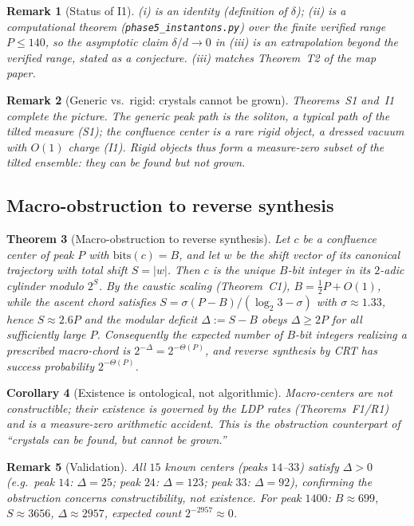 \documentclass[12pt,a4paper]{article}
\newtheorem{theorem}{Theorem}[section]
\newtheorem{corollary}[theorem]{Corollary}
\newtheorem{remark}[theorem]{Remark}
\begin{document}
\begin{remark}[Status of I1]
(i) is an identity (definition of $\delta$); (ii) is a computational theorem
(\texttt{phase5\_instantons.py}) over the finite verified range $P\le140$, so the
asymptotic claim $\delta/d\to0$ in (iii) is an extrapolation beyond the verified
range, stated as a conjecture. (iii) matches Theorem~T2 of the map paper.
\end{remark}

\begin{remark}[Generic vs.\ rigid: crystals cannot be grown]
Theorems~S1 and~I1 complete the picture. The \emph{generic} peak path is the
soliton, a typical path of the tilted measure (S1); the confluence center is a
\emph{rare rigid} object, a dressed vacuum with $O(1)$ charge (I1). Rigid objects
thus form a measure-zero subset of the tilted ensemble: they can be found but not
grown.
\end{remark}

\subsection{Macro-obstruction to reverse synthesis}

\begin{theorem}[Macro-obstruction to reverse synthesis]
\label{thm:macro_obstruction}
Let $c$ be a confluence center of peak $P$ with $\mathrm{bits}(c)=B$, and let $w$
be the shift vector of its canonical trajectory with total shift $S=|w|$.
Then $c$ is the unique $B$-bit integer in its $2$-adic cylinder modulo $2^{S}$.
By the caustic scaling (Theorem~C1), $B=\tfrac12 P+O(1)$, while the ascent chord
satisfies $S=\sigma(P-B)/(\log_2 3-\sigma)$ with $\sigma\approx1.33$, hence
$S\approx2.6P$ and the modular deficit $\Delta:=S-B$ obeys $\Delta\ge2P$ for all
sufficiently large $P$. Consequently the expected number of $B$-bit integers
realizing a prescribed macro-chord is $2^{-\Delta}=2^{-\Theta(P)}$, and reverse
synthesis by CRT has success probability $2^{-\Theta(P)}$.
\end{theorem}

\begin{corollary}[Existence is ontological, not algorithmic]
Macro-centers are not constructible; their existence is governed by the LDP
rates (Theorems~F1/R1) and is a measure-zero arithmetic accident. This is the
obstruction counterpart of ``crystals can be found, but cannot be grown.''
\end{corollary}

\begin{remark}[Validation]
All $15$ known centers (peaks $14$--$33$) satisfy $\Delta>0$
(e.g.\ peak $14$: $\Delta=25$; peak $24$: $\Delta=123$; peak $33$: $\Delta=92$),
confirming the obstruction concerns constructibility, not existence.
For peak $1400$: $B\approx699$, $S\approx3656$, $\Delta\approx2957$, expected count
$2^{-2957}\approx0$.
\end{remark}
\end{document}
